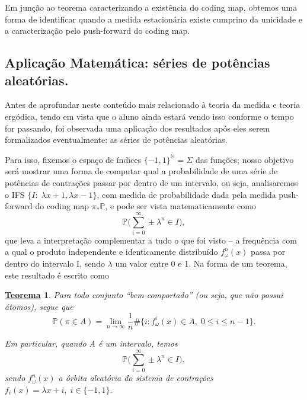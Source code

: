 \documentclass[12pt]{article}
\newtheorem*{theorem*}{\underline{Teorema}}
\theoremstyle{definition}
\begin{document}
Em junção ao teorema caracterizando a existência do coding map, obtemos uma forma de identificar quando a medida estacionária existe cumprino da unicidade e a caracterização pelo push-forward do coding map.

\subsection*{Aplicação Matemática: séries de potências aleatórias.}
Antes de aprofundar neste conteúdo mais relacionado à teoria da medida e teoria ergódica, tendo em vista que o aluno ainda estará vendo isso conforme o tempo for passando, foi observada uma aplicação dos resultados após eles serem formalizados eventualmente: as séries de potências aleatórias.

Para isso, fixemos o espaço de índices \(\{-1, 1\}^{\mathbb{N}}=\Sigma\) das funções; nosso objetivo será mostrar uma forma de computar qual a probabilidade de uma série de potências de contrações passar por dentro de um intervalo, ou seja, analisaremos o IFS \(\{I:\; \lambda x + 1, \lambda x-1\}\), com medida de probabilidade dada pela medida push-forward do coding map \(\pi _{*}\mathbb{P} \), e pode ser vista matematicamente como
\[
	\mathbb{P}\biggl(\sum_{i=0}^{\infty}\pm \lambda^{n}\in I\biggr),
\]
que leva a interpretação complementar a tudo o que foi visto -- a frequência com a qual o produto independente e identicamente distribuído \(f_{\omega }^{n}(x)\) passa por dentro do intervalo I, sendo \(\lambda \) um valor entre 0 e 1. Na forma de um teorema, este resultado é escrito como
\begin{theorem*}
	Para todo conjunto ``bem-comportado'' (ou seja, que não possui \textit{átomos}), segue que
	\[
		\mathbb{P}(\pi \in A) = \lim_{n\to \infty}\frac{1}{n}\# \biggl\{i: f_{\omega }^{i}(x)\in A,\; 0\leq i\leq n-1\biggr\}.
	\]

	Em particular, quando A é um intervalo, temos
	\[
		\mathbb{P}\biggl(\sum_{i=0}^{\infty}\pm \lambda^{n}\in I\biggr),
	\]
	sendo \(f_{\omega }^{n}(x)\) a órbita aleatória do sistema de contrações \(f_{i}(x) = \lambda x + i,\; i\in \{-1, 1\}.\)
\end{theorem*}
\end{document}
